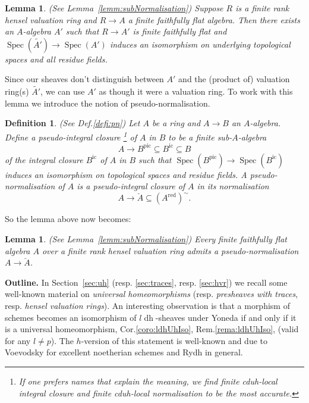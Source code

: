 \documentclass[10pt]{amsart}
\newtheorem{defi}[theo]{Definition}
\newtheorem{lemm}[theo]{Lemma}
\theoremstyle{definition}
\DeclareMathOperator{\Spec}{Spec}
\newcommand{\ldh}{{l{\operatorname{dh}}}}
\newcommand{\red}{{\operatorname{red}}}
\newcommand{\ic}{{\operatorname{ic}}}
\newcommand{\pic}{{\operatorname{pic}}}
\begin{document}
\begin{lemm}{(See Lemma~\ref{lemm:subNormalisation})} \label{lem:introExistPN}
Suppose $R$ is a finite rank hensel valuation ring and $R \to A$ a finite faithfully flat algebra. Then there exists an $A$-algebra $A'$ such that $R \to A'$ is finite faithfully flat and $\Spec(\widetilde{A'}) \to \Spec(A')$ induces an isomorphism on underlying topological spaces and all residue fields.
\end{lemm}

Since our sheaves don't distinguish between $A'$ and the (product of) valuation ring(s) $\widetilde{A'}$, we can use $A'$ as though it were a valuation ring. To work with this lemma we introduce the notion of pseudo-normalisation.

\begin{defi}{({See Def.\ref{defi:pn}})}
Let $A$ be a ring and $A \to B$ an $A$-algebra. Define a \emph{pseudo-integral closure}%
\footnote{If one prefers names that explain the meaning, we find \emph{finite cduh-local integral closure} and \emph{finite cduh-local normalisation} to be the most accurate.} %
of $A$ in $B$ to be a \emph{finite} sub-$A$-algebra 
\[ A \to B^{\pic} \subseteq B^{\ic} \subseteq B \]
of the integral closure $B^{\ic}$ of $A$ in $B$ such that $\Spec(B^\pic) \to \Spec(B^\ic)$ induces an isomorphism on topological spaces and residue fields. A \emph{pseudo-normalisation} of $A$ is a pseudo-integral closure of $A$ in its normalisation 
\[ A \to \breve{A} \subseteq (A^\red)^\sim. \]
\end{defi}

So the lemma above now becomes:

\begin{lemm}{(See Lemma~\ref{lemm:subNormalisation})}
Every finite faithfully flat algebra $A$ over a finite rank hensel valuation ring admits a pseudo-normalisation $A \to \breve{A}$.
\end{lemm}


\textbf{Outline.} In Section~\ref{sec:uh} (resp. \ref{sec:traces}, resp. \ref{sec:hvr}) we recall some well-known material on \emph{universal homeomorphisms} (resp. \emph{presheaves with traces}, resp. \emph{hensel valuation rings}). An interesting observation is that a morphism of schemes becomes an isomorphism of $\ldh$-sheaves under Yoneda if and only if it is a universal homeomorphism, Cor.\ref{coro:ldhUhIso}, Rem.\ref{rema:ldhUhIso}, (valid for any $l \neq p$). The $h$-version of this statement is well-known and due to Voevodsky \cite{Voe96} for excellent noetherian schemes and Rydh \cite{Ryd10} in general.
\end{document}
